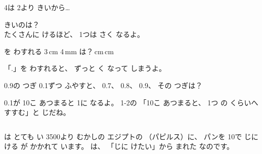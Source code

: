 \begin{tsumazuki}{4は 2より きいから…}
\noindent\begin{minipage}[c]{0.7\linewidth}
きいのは？\hspace{1\zw}\bkbatsu\enspace{}\hspace{1.5\zw}\bkmaru\enspace{}\\
たくさんに けるほど、 1つは さく なるよ。
\end{minipage}\hfill
\begin{minipage}[c]{0.28\linewidth}\centering
{}
\end{minipage}
\end{tsumazuki}

\begin{tsumazuki}{を わすれる}
3\,cm 4\,mm は？\hspace{1\zw}\bkbatsu{}\,cm\hspace{2\zw}\bkmaru{}\,cm\par
「.」を わすれると、 ずっと く なって しまうよ。
\end{tsumazuki}

\begin{tsumazuki}{0.9の つぎ}
0.1ずつ ふやすと、 0.7、 0.8、 0.9、 その つぎは？\\
\bkbatsu{}\hspace{3\zw}\bkmaru{}\par
0.1が 10こ あつまると 1に なるよ。 1-2の 「10こ あつまると、 1つ の くらいへ すすむ」と じだね。
\end{tsumazuki}

\begin{column}{は とても い}
\mbox{3500}より むかしの エジプトの （パピルス）に、 パンを \mbox{10}で じに ける \mbox{}が かかれて います。 \mbox{}は、 「じに けたい」から まれた なのです。
\end{column}

